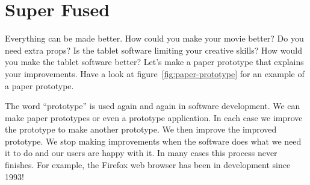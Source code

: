 \documentclass[a5paper]{tufte-book}
\begin{document}
\section*{Super Fused}
Everything can be made better.  How could you make your movie better?  Do you need extra props?  Is the tablet software limiting your creative skills?  How would you make the tablet software better?  Let's make a paper prototype that explains your improvements.  Have a look at figure~\ref{fig:paper-prototype} for an example of a paper prototype.

The word ``prototype'' is used again and again in software development.  We can make paper prototypes or even a prototype application.  In each case we improve the prototype to make another prototype.  We then improve the improved prototype.  We stop making improvements when the software does what we need it to do and our users are happy with it.  In many cases this process never finishes.  For example, the Firefox web browser has been in development since 1993!
\end{document}
